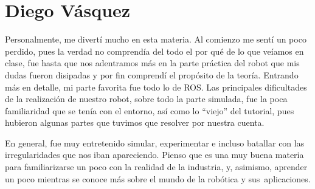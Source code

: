 \section{Diego Vásquez}
Personalmente, me divertí mucho en esta materia. Al comienzo me sentí un poco perdido, pues la verdad no comprendía del todo el por qué de lo que veíamos en clase, fue hasta que nos adentramos más en la parte práctica del robot que mis dudas fueron disipadas y por fin comprendí el propósito de la teoría. Entrando más en detalle, mi parte favorita fue todo lo de ROS. Las principales dificultades de la realización de nuestro robot, sobre todo la parte simulada, fue la poca familiaridad que se tenía con el entorno, así como lo “viejo” del tutorial, pues hubieron algunas partes que tuvimos que resolver por nuestra cuenta.

En general, fue muy entretenido simular, experimentar e incluso batallar con las irregularidades que nos iban apareciendo. Pienso que es una muy buena materia para familiarizarse un poco con la realidad de la industria, y, asimismo, aprender un poco mientras se conoce más sobre el mundo de la robótica y sus aplicaciones.